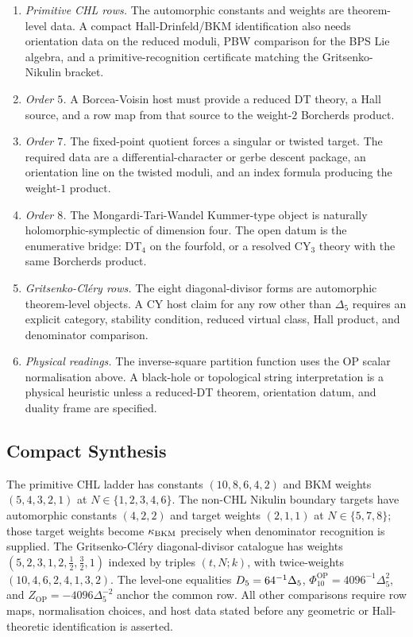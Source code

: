 \begin{enumerate}
\item \emph{Primitive CHL rows.}  The automorphic constants and weights
are theorem-level data.  A compact Hall-Drinfeld/BKM identification
also needs orientation data on the reduced moduli, PBW comparison for
the BPS Lie algebra, and a primitive-recognition certificate matching
the Gritsenko-Nikulin bracket.
\item \emph{Order $5$.}  A Borcea-Voisin host must provide a reduced
DT theory, a Hall source, and a row map from that source to the
weight-$2$ Borcherds product.
\item \emph{Order $7$.}  The fixed-point quotient forces a singular or
twisted target.  The required data are a differential-character or
gerbe descent package, an orientation line on the twisted moduli, and
an index formula producing the weight-$1$ product.
\item \emph{Order $8$.}  The Mongardi-Tari-Wandel Kummer-type object
is naturally holomorphic-symplectic of dimension four.  The open datum
is the enumerative bridge: DT$_4$ on the fourfold, or a resolved
CY$_3$ theory with the same Borcherds product.
\item \emph{Gritsenko-Cl\'ery rows.}  The eight diagonal-divisor forms
are automorphic theorem-level objects.  A CY host claim for any row
other than $\Delta_5$ requires an explicit category, stability
condition, reduced virtual class, Hall product, and denominator
comparison.
\item \emph{Physical readings.}  The inverse-square partition function
uses the OP scalar normalisation above.  A black-hole or topological
string interpretation is a physical heuristic unless a reduced-DT
theorem, orientation datum, and duality frame are specified.
\end{enumerate}

\subsection*{Compact Synthesis}

The primitive CHL ladder has constants
$(10,8,6,4,2)$ and BKM weights $(5,4,3,2,1)$ at
$N\in\{1,2,3,4,6\}$.  The non-CHL Nikulin boundary targets have
automorphic constants $(4,2,2)$ and target weights $(2,1,1)$ at
$N\in\{5,7,8\}$; those target weights become $\kappa_{\mathrm{BKM}}$ precisely when
denominator recognition is supplied.  The Gritsenko-Cl\'ery
diagonal-divisor catalogue has weights
$(5,2,3,1,2,\tfrac12,\tfrac32,1)$ indexed by triples $(t,N;k)$, with
twice-weights $(10,4,6,2,4,1,3,2)$.  The level-one equalities
$D_5=64^{-1}\Delta_5$,
$\Phi_{10}^{\mathrm{OP}}=4096^{-1}\Delta_5^2$, and
$Z_{\mathrm{OP}}=-4096\Delta_5^{-2}$ anchor the common row.  All other
comparisons require row maps, normalisation choices, and host data
stated before any geometric or Hall-theoretic identification is
asserted.
